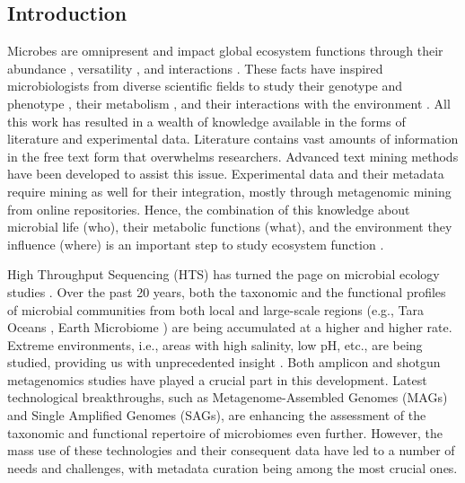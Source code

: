 \subsection{Introduction}
\label{sec:prego-intro}

   Microbes are omnipresent and impact global ecosystem functions \citep{falkowski2008microbial} through their abundance \citep{bar2018biomass}, versatility \citep{delgado2016microbial}, and interactions \citep{rottjers2018hairballs}. 
   These facts have inspired microbiologists from diverse scientific fields to study their genotype and phenotype \citep{morris2020linking}, their metabolism \citep{biggs2015metabolic}, and their interactions with the environment \citep{hall2018understanding}. 
   All this work has resulted in a wealth of knowledge available in the forms of literature and experimental data. Literature contains vast amounts of information in the free text form that overwhelms researchers. 
   Advanced text mining methods \citep{jensen2006literature} have been developed to assist this issue. 
   Experimental data and their metadata require mining \citep{delmont2011metagenomic} as well for their integration, mostly through metagenomic mining from online repositories. 
   Hence, the combination of this knowledge about microbial life (who), their metabolic functions (what), and the environment they influence (where) is an important step to study ecosystem function \citep{raes2008molecular}.

   High Throughput Sequencing (HTS) has turned the page on microbial ecology studies \citep{nilsson2019mycobiome}. 
   Over the past 20 years, both the taxonomic and the functional profiles of microbial communities from both local and large-scale regions (e.g., Tara Oceans \citep{pesant2015open}, Earth Microbiome \citep{gilbert2014earth}) are being accumulated at a higher and higher rate. 
   Extreme environments, i.e., areas with high salinity, low pH, etc., are being studied, providing us with unprecedented insight \citep{shu2021microbial}. 
   Both amplicon and shotgun metagenomics studies have played a crucial part in this development. Latest technological breakthroughs, such as Metagenome-Assembled Genomes (MAGs) and Single Amplified Genomes (SAGs), are enhancing the assessment of the taxonomic and functional repertoire of microbiomes even further. 
   However, the mass use of these technologies and their consequent data have led to a number of needs and challenges, with metadata curation being among the most crucial ones.

